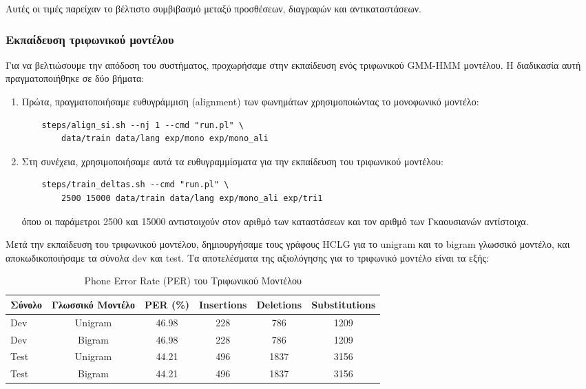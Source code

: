\documentclass[a4paper,12pt]{article}
\begin{document}
Αυτές οι τιμές παρείχαν το βέλτιστο συμβιβασμό μεταξύ προσθέσεων, διαγραφών και αντικαταστάσεων.

\subsubsection{Εκπαίδευση τριφωνικού μοντέλου}

Για να βελτιώσουμε την απόδοση του συστήματος, προχωρήσαμε στην εκπαίδευση ενός τριφωνικού GMM-HMM μοντέλου. Η διαδικασία αυτή πραγματοποιήθηκε σε δύο βήματα:

\begin{enumerate}
    \item Πρώτα, πραγματοποιήσαμε ευθυγράμμιση (alignment) των φωνημάτων χρησιμοποιώντας το μονοφωνικό μοντέλο:
    \begin{lstlisting}
    steps/align_si.sh --nj 1 --cmd "run.pl" \
        data/train data/lang exp/mono exp/mono_ali
    \end{lstlisting}
    
    \item Στη συνέχεια, χρησιμοποιήσαμε αυτά τα ευθυγραμμίσματα για την εκπαίδευση του τριφωνικού μοντέλου:
    \begin{lstlisting}
    steps/train_deltas.sh --cmd "run.pl" \
        2500 15000 data/train data/lang exp/mono_ali exp/tri1
    \end{lstlisting}
    όπου οι παράμετροι 2500 και 15000 αντιστοιχούν στον αριθμό των καταστάσεων και τον αριθμό των Γκαουσιανών αντίστοιχα.
\end{enumerate}

Μετά την εκπαίδευση του τριφωνικού μοντέλου, δημιουργήσαμε τους γράφους HCLG για το unigram και το bigram γλωσσικό μοντέλο, και αποκωδικοποιήσαμε τα σύνολα dev και test. Τα αποτελέσματα της αξιολόγησης για το τριφωνικό μοντέλο είναι τα εξής:

\begin{table}[h]
\centering
\caption{Phone Error Rate (PER) του Τριφωνικού Μοντέλου}
\label{tab:tri_per}
\begin{tabular}{@{}lccccc@{}}
\toprule
\textbf{Σύνολο} & \textbf{Γλωσσικό Μοντέλο} & \textbf{PER (\%)} & \textbf{Insertions} & \textbf{Deletions} & \textbf{Substitutions} \\
\midrule
Dev & Unigram & 46.98 & 228 & 786 & 1209 \\
Dev & Bigram & 46.98 & 228 & 786 & 1209 \\
Test & Unigram & 44.21 & 496 & 1837 & 3156 \\
Test & Bigram & 44.21 & 496 & 1837 & 3156 \\
\bottomrule
\end{tabular}
\end{table}
\end{document}
